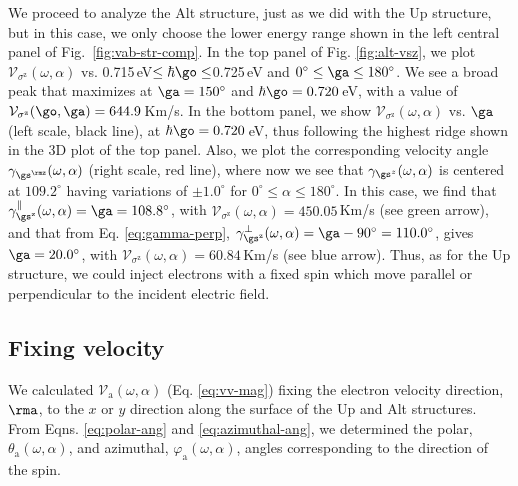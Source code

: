 \documentclass[floatfix,prb,aps,superscriptaddress,showpacs,11pt,preprint,letterpaper]{revtex4}
\begin{document}
We proceed to analyze the Alt structure, just as we did with the Up structure, but
in this case, we only choose the lower energy range shown in the left central
panel of Fig.~\ref{fig:vab-str-comp}. 
% 
In the top panel of Fig. \ref{fig:alt-vsz}, we plot
$\mathcal{V}_{\sigma^{\mathrm{z}}} (\omega,\alpha)$ vs.
0.715\,eV$\leq\hbar\go\leq$0.725\,eV and $0^\circ\leq\ga\leq 180^\circ$. We
see a broad peak that maximizes at $\ga=150^{\circ}$ and $\hbar\go=
0.720$\,eV, with a value of $\mathcal{V}_{\sigma^{\mathrm{z}}}(\go,\ga) =
644.9$\,Km/s.
% 
In the bottom panel, we  show $\mathcal{V}_{\sigma^{\mathrm{z}}}
(\omega,\alpha)$ vs. $\ga$ (left scale, black line), at $\hbar\go= 0.720$\,eV,
 thus following the highest ridge shown in the 3D plot of the top
panel. Also, we plot the corresponding velocity angle $\gamma_{\gs^\rmz}
(\omega,\alpha)$ (right scale, red line), where now we see that
$\gamma_{\gs^z}(\omega,\alpha)$ is centered at $109.2^{\circ}$ having
variations of $\pm 1.0^{\circ}$ for $0^{\circ} \leq
\alpha \leq 180^{\circ}$.
% 
In this case, we find that $\gamma^\parallel_{\gs^\mathrm{z}} (\omega,\alpha) =
\ga = 108.8^\circ$, with $\mathcal{V}_{\sigma^{\mathrm{z}}} (\omega,\alpha) =
450.05$\,Km/s (see green arrow), and that from Eq. \eqref{eq:gamma-perp},
$\gamma^\perp_{\gs^\mathrm{z}}(\omega,\alpha)=\ga-90^\circ=110.0^\circ$,
gives $\ga=20.0^\circ$, with $\mathcal{V}_{\sigma^{\mathrm{z}}}
(\omega,\alpha) = 60.84$\,Km/s (see blue arrow). Thus, as for the Up structure,
we could inject electrons with a fixed spin which move parallel or perpendicular
to the incident electric field.


\subsection{Fixing velocity} 
\label{sec:res-fixvel}

We calculated $\mathcal{V}_{\mathrm{a}}(\omega,\alpha)$ (Eq. \eqref{eq:vv-mag})
fixing the electron velocity direction, $\rma$, to the $x$ or $y$ direction
along the surface of the Up and Alt structures. From Eqns. \eqref{eq:polar-ang}
and \eqref{eq:azimuthal-ang}, we determined the polar, $\theta_{\mathrm{a}}
(\omega,\alpha)$, and azimuthal, $\varphi_{\mathrm{a}} (\omega,\alpha)$, angles
corresponding to the direction of the spin.
\end{document}
